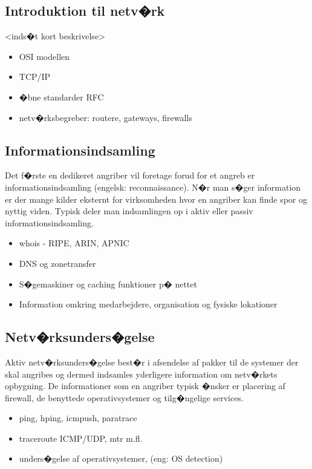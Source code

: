 \documentclass[a4paper,12pt]{article}
\begin{document}
\subsection{Introduktion til netv�rk}

<inds�t kort beskrivelse>

\begin{itemize}
\item OSI modellen
\item TCP/IP
\item �bne standarder RFC
\item netv�rksbegreber: routere, gateways, firewalls
\end{itemize}


\subsection{Informationsindsamling}

Det f�rste en dedikeret angriber vil foretage forud for et angreb er
informationsindsamling (engelsk: reconnaissance). N�r man s�ger
information er der mange kilder eksternt for virksomheden hvor en
angriber kan finde spor og nyttig viden.
Typisk deler man indsamlingen op i aktiv eller passiv
informationsindsamling.

\begin{itemize}
\item whois - RIPE, ARIN, APNIC
\item DNS og zonetransfer
\item S�gemaskiner og caching funktioner p� nettet
\item Information omkring medarbejdere, organisation og fysiske
  lokationer
\end{itemize}

\subsection{Netv�rksunders�gelse}

Aktiv netv�rksunders�gelse best�r i afsendelse af pakker til de
systemer der skal angribes og dermed indsamles yderligere information
om netv�rkets opbygning. De informationer som en angriber typisk
�nsker er placering af firewall, de benyttede operativsystemer og
tilg�ngelige services.

\begin{itemize}
\item ping, hping, icmpush, paratrace
\item traceroute ICMP/UDP, mtr m.fl.
\item unders�gelse af operativsystemer, (eng: OS detection)
\end{itemize}
\end{document}
